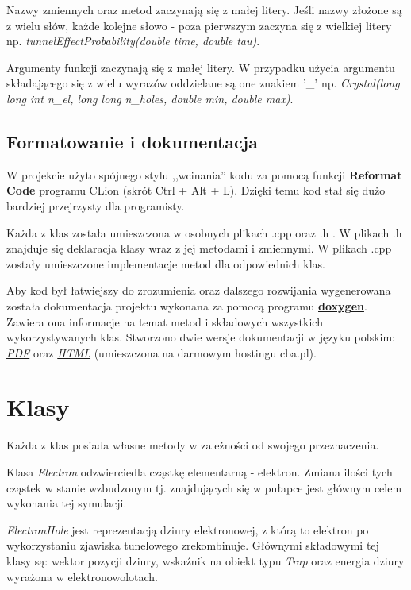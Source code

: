 Nazwy zmiennych oraz metod zaczynają się z małej litery. Jeśli nazwy złożone są z wielu słów, każde kolejne słowo - poza pierwszym zaczyna się z wielkiej litery np. \textit{tunnelEffectProbability(double time, double tau)}. 

Argumenty funkcji zaczynają się z małej litery. W przypadku użycia argumentu składającego się z wielu wyrazów oddzielane są one znakiem '\_'  np. \textit{Crystal(long long int n\_el, long long n\_holes, double min, double max)}.

\subsection{Formatowanie i dokumentacja}

W projekcie użyto spójnego stylu ,,wcinania'' kodu za pomocą funkcji \textbf{Reformat Code} programu CLion (skrót Ctrl + Alt + L). Dzięki temu kod stał się dużo bardziej przejrzysty dla programisty.

Każda z klas została umieszczona w osobnych plikach .cpp oraz .h . W plikach .h znajduje się deklaracja klasy wraz z jej metodami i zmiennymi. W plikach .cpp zostały umieszczone implementacje metod dla odpowiednich klas. 

Aby kod był łatwiejszy do zrozumienia oraz dalszego rozwijania wygenerowana została dokumentacja projektu wykonana za pomocą programu \hyperref[tech:doxy]{\textbf{doxygen}}. Zawiera ona informacje na temat metod i składowych wszystkich wykorzystywanych klas. Stworzono dwie wersje dokumentacji w języku polskim: \href{https://github.com/Sharkuu/Dissertation/blob/master/Dokumentacja\%20pdf/Dokumentacja.pdf}{\emph{PDF}} oraz \href{http://dokumentacja.c0.pl/}{\emph{HTML}} (umieszczona na darmowym hostingu cba.pl).

\section{Klasy}
Każda z klas posiada własne metody w zależności od swojego przeznaczenia.

Klasa \textit{Electron} odzwierciedla cząstkę elementarną - elektron. Zmiana ilości tych cząstek w stanie wzbudzonym tj. znajdujących się w pułapce jest głównym celem wykonania tej symulacji.

\textit{ElectronHole} jest reprezentacją dziury elektronowej, z którą to elektron po wykorzystaniu zjawiska tunelowego zrekombinuje. Głównymi składowymi tej klasy są: wektor pozycji dziury, wskaźnik na obiekt typu \textit{Trap} oraz energia dziury wyrażona w elektronowolotach. 

